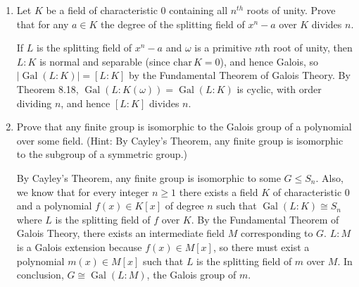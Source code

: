 \documentclass[12pt]{article}
\DeclareMathOperator{\Gal}{Gal}
\begin{document}
\begin{enumerate}
    \item Let $K$ be a field of characteristic $0$ containing all $n^{th}$ roots of unity.  Prove that for any $a \in K$ the degree of the splitting field of $x^n-a$ over $K$ divides $n$. \par
        If $L$ is the splitting field of $x^n - a$ and $\omega$ is a primitive $n$th root of unity, then $L : K$ is normal and separable (since $\text{char}\, K = 0$), and hence Galois, so $|\Gal(L : K)| = [L : K]$ by the Fundamental Theorem of Galois Theory. By Theorem 8.18, $\Gal(L : K(\omega)) = \Gal(L : K)$ is cyclic, with order dividing $n$, and hence $[L : K]$ divides $n$.

    \item Prove that any finite group is isomorphic to the Galois group of a polynomial over some field.  (Hint: By Cayley's Theorem, any finite group is isomorphic to the subgroup of a symmetric group.) \par
        By Cayley's Theorem, any finite group is isomorphic to some $G \leq S_n$. Also, we know that for every integer $n \geq 1$ there exists a field $K$ of characteristic 0 and a polynomial $f(x) \in K[x]$ of degree $n$ such that $\Gal(L : K) \cong S_n$ where $L$ is the splitting field of $f$ over $K$. By the Fundamental Theorem of Galois Theory, there exists an intermediate field $M$ corresponding to $G$. $L : M$ is a Galois extension because $f(x) \in M[x]$, so there must exist a polynomial $m(x) \in M[x]$ such that $L$ is the splitting field of $m$ over $M$. In conclusion, $G \cong \Gal(L : M)$, the Galois group of $m$.
\end{enumerate}
\end{document}
